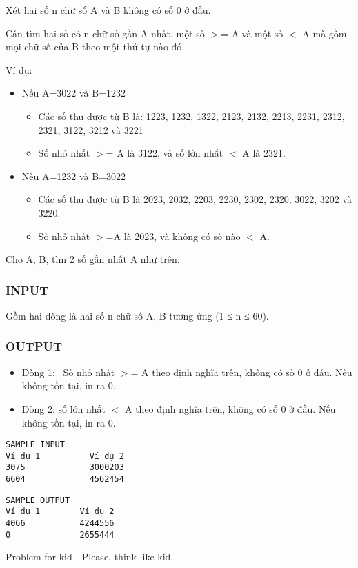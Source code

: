 

Xét hai số n chữ số A và B không có số 0 ở đầu.

Cần tìm hai số có n chữ số gần A nhất, một số $>$= A và một số $<$ A mà gồm mọi chữ số của B theo một thứ tự nào đó.

Ví dụ:
\begin{itemize}
	\item Nếu A=3022 và B=1232
\begin{itemize}
	\item Các số thu được từ B là: 1223, 1232, 1322, 2123, 2132, 2213, 2231, 2312, 2321, 3122, 3212 và 3221
	\item Số nhỏ nhất $>$= A là 3122, và số lớn nhất $<$ A là 2321.
\end{itemize}
	\item Nếu A=1232 và B=3022
\begin{itemize}
	\item Các số thu được từ B là 2023, 2032, 2203, 2230, 2302, 2320, 3022, 3202 và 3220.
	\item Số nhỏ nhất $>$=A là 2023, và không có số nào $<$ A.
\end{itemize}
\end{itemize}

Cho A, B, tìm 2 số gần nhất A như trên.

\subsubsection{INPUT}

Gồm hai dòng là hai số n chữ số A, B tương ứng (1 ≤ n ≤ 60).

\subsubsection{OUTPUT}
\begin{itemize}
	\item Dòng 1:  Số nhỏ nhất $>$= A theo định nghĩa trên, không có số 0 ở đầu. Nếu không tồn tại, in ra 0.
	\item Dòng 2: số lớn nhất $<$ A theo định nghĩa trên, không có số 0 ở đầu. Nếu không tồn tại, in ra 0.
\end{itemize}
\begin{verbatim}
SAMPLE INPUT
Ví dụ 1          Ví dụ 2
3075             3000203 
6604             4562454\end{verbatim}
\begin{verbatim}
SAMPLE OUTPUT
Ví dụ 1        Ví dụ 2
4066           4244556 
0              2655444 
\end{verbatim}

Problem for kid - Please, think like kid.